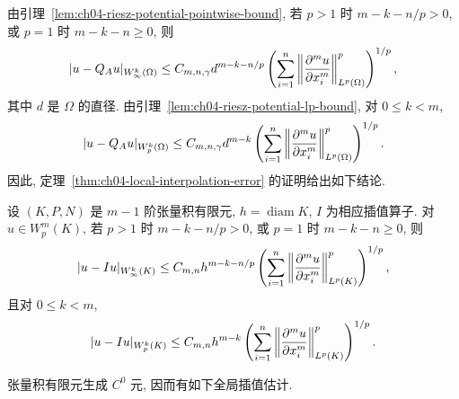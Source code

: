 由引理~\ref{lem:ch04-riesz-potential-pointwise-bound}, 若 $p>1$ 时 $m-k-n/p>0$, 或 $p=1$ 时 $m-k-n\geq0$, 则
\begin{equation}
\MathBookFormulaID{formula-ch04-tensor-product-remainder-linfty}
\label{eq:ch04-tensor-product-remainder-linfty}
|u-Q_Au|_{W_\infty^k(\Omega)}
\leq C_{m,n,\gamma}d^{m-k-n/p}
\left(\sum_{i=1}^n\left\|\frac{\partial^m u}{\partial x_i^m}\right\|_{L^p(\Omega)}^p\right)^{1/p},
\end{equation}
其中 $d$ 是 $\Omega$ 的直径. 由引理~\ref{lem:ch04-riesz-potential-lp-bound}, 对 $0\leq k<m$,
\begin{equation}
\MathBookFormulaID{formula-ch04-tensor-product-remainder-lp}
\label{eq:ch04-tensor-product-remainder-lp}
|u-Q_Au|_{W_p^k(\Omega)}
\leq C_{m,n,\gamma}d^{m-k}
\left(\sum_{i=1}^n\left\|\frac{\partial^m u}{\partial x_i^m}\right\|_{L^p(\Omega)}^p\right)^{1/p}.
\end{equation}
因此, 定理~\ref{thm:ch04-local-interpolation-error} 的证明给出如下结论.

\setcounter{thmcount}{10}
\begin{Theorem}
\label{thm:ch04-local-tensor-product-interpolation}
设 $(K,P,N)$ 是 $m-1$ 阶张量积有限元, $h=\operatorname{diam}K$, $I$ 为相应插值算子. 对 $u\in W_p^m(K)$, 若 $p>1$ 时 $m-k-n/p>0$, 或 $p=1$ 时 $m-k-n\geq0$, 则
\begin{equation}
\MathBookFormulaID{formula-ch04-local-tensor-product-linfty-error}
\label{eq:ch04-local-tensor-product-linfty-error}
|u-Iu|_{W_\infty^k(K)}
\leq C_{m,n}h^{m-k-n/p}
\left(\sum_{i=1}^n\left\|\frac{\partial^m u}{\partial x_i^m}\right\|_{L^p(K)}^p\right)^{1/p},
\end{equation}
且对 $0\leq k<m$,
\begin{equation}
\MathBookFormulaID{formula-ch04-local-tensor-product-lp-error}
\label{eq:ch04-local-tensor-product-lp-error}
|u-Iu|_{W_p^k(K)}
\leq C_{m,n}h^{m-k}
\left(\sum_{i=1}^n\left\|\frac{\partial^m u}{\partial x_i^m}\right\|_{L^p(K)}^p\right)^{1/p}.
\end{equation}
\end{Theorem}

张量积有限元生成 $C^0$ 元, 因而有如下全局插值估计.

